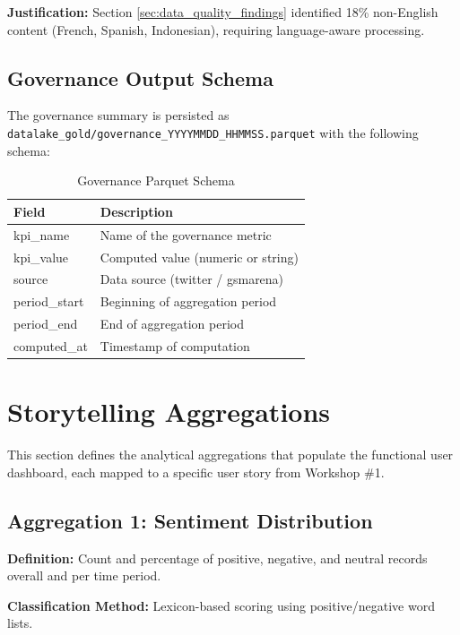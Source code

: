 \documentclass[12pt]{article}
\begin{document}
\textbf{Justification:} Section \ref{sec:data_quality_findings} identified 18\% non-English content (French, Spanish, Indonesian), requiring language-aware processing.

\subsection{Governance Output Schema}

The governance summary is persisted as \texttt{datalake\_gold/governance\_YYYYMMDD\_HHMMSS.parquet} with the following schema:

\begin{table}[H]
\centering
\caption{Governance Parquet Schema}
\label{tab:governance_schema}
\begin{tabular}{p{4cm}p{8cm}}
\toprule
\textbf{Field} & \textbf{Description} \\
\midrule
kpi\_name & Name of the governance metric \\
kpi\_value & Computed value (numeric or string) \\
source & Data source (twitter / gsmarena) \\
period\_start & Beginning of aggregation period \\
period\_end & End of aggregation period \\
computed\_at & Timestamp of computation \\
\bottomrule
\end{tabular}
\end{table}

\newpage

\section{Storytelling Aggregations}
\label{sec:storytelling_aggregations}

This section defines the analytical aggregations that populate the functional user dashboard, each mapped to a specific user story from Workshop \#1.

\subsection{Aggregation 1: Sentiment Distribution}

\textbf{Definition:} Count and percentage of positive, negative, and neutral records overall and per time period.

\textbf{Classification Method:} Lexicon-based scoring using positive/negative word lists.
\end{document}

